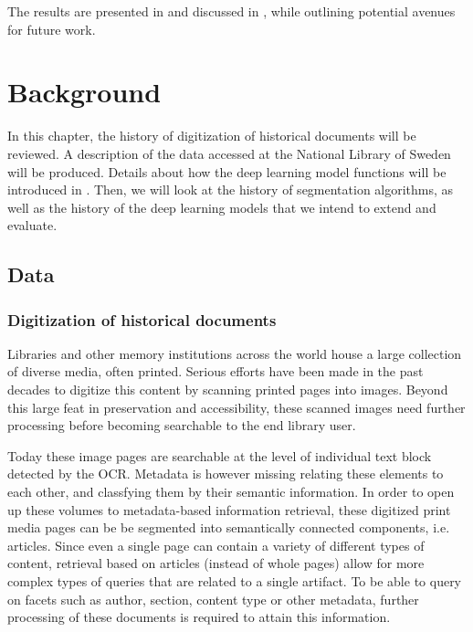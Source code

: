\documentclass[oneside, english, bibtex]{kththesis}
\begin{document}
The results are presented in  and discussed in ,
while outlining potential avenues for future work.

\cleardoublepage
\chapter{Background}
\label{ch:background}

In this chapter, the history of digitization of historical documents will be reviewed. A description of the data accessed at the National Library of Sweden will be produced. Details about how the deep learning model functions will be introduced in . Then, we will look at the history of segmentation algorithms, as well as the history of the deep learning models that we intend to extend and evaluate. 

\section{Data}

\subsection{Digitization of historical documents}

Libraries and other memory institutions across the world house a large collection of diverse media, often printed. Serious efforts have been made in the past decades to digitize this content by scanning printed pages into images. Beyond this large feat in preservation and accessibility, these scanned images need further processing before becoming searchable to the end library user.

Today these image pages are searchable at the level of individual text block detected by the OCR. Metadata is however missing relating these elements to each other, and classfying them by their semantic information.
In order to open up these volumes to metadata-based information retrieval, these digitized print media pages can be be segmented into semantically connected components, i.e. articles. Since even a single page can contain a variety of different types of content, retrieval based on articles (instead of whole pages) allow for more complex types of queries that are related to a single artifact. To be able to query on facets such as author, section, content type or other metadata, further processing of these documents is required to attain this information.
\end{document}
